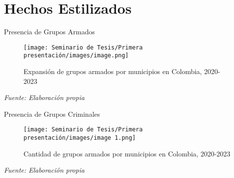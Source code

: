 \section{Hechos Estilizados}

\begin{frame}{Presencia de Grupos Armados}
    \begin{figure}[ht]
        \centering
        \texttt{[image: Seminario de Tesis/Primera presentación/images/image.png]}
        \caption{\footnotesize Expansión de grupos armados por municipios en Colombia, 2020-2023}
    \end{figure}

    \centering
    \footnotesize\textit{Fuente: Elaboración propia}
\end{frame}

\begin{frame}{Presencia de Grupos Criminales}
    \begin{figure}[ht]
        \centering
        \texttt{[image: Seminario de Tesis/Primera presentación/images/image 1.png]}
        \caption{\footnotesize Cantidad de grupos armados por municipios en Colombia, 2020-2023}
    \end{figure}

    \centering
    \footnotesize\textit{Fuente: Elaboración propia}
\end{frame}


